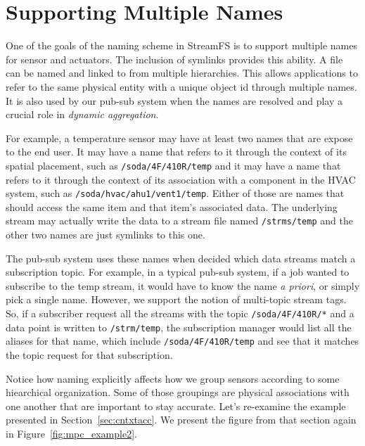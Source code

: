 \section{Supporting Multiple Names}

One of the goals of the naming scheme in StreamFS is to support multiple names for sensor and actuators.  The inclusion of symlinks 
provides this ability.  A file can be named and linked to from multiple hierarchies.  This allows applications to refer
to the same physical entity with a unique object id through multiple names.  It is also used by our pub-sub system when
the names are resolved and play a crucial role in \emph{dynamic aggregation}.

For example, a temperature sensor may have at least two names that are expose to the end user.  It may have a name that refers to 
it through the context of its spatial placement, such as \texttt{/soda/4F/410R/temp} and it may have a name that refers to it 
through the context of its association with a component in the HVAC system, such as \texttt{/soda/hvac/ahu1/vent1/temp}.  Either
of those are names that should access the same item and that item's associated data.  The underlying stream may actually write
the data to a stream file named \texttt{/strms/temp} and the other two names are just symlinks to this one.  

The pub-sub system uses these names when decided which data streams match a subscription topic.  For example, in a typical pub-sub system,
if a job wanted to subscribe to the temp stream, it would have to know the name \emph{a priori}, or simply pick a single name.
However, we support the notion of multi-topic stream tags.  So, if a subscriber request all the streams with the topic 
\texttt{/soda/4F/410R/*} and a data point is written to \texttt{/strm/temp}, the subscription manager would list all the aliases
for that name, which include \texttt{/soda/4F/410R/temp} and see that it matches the topic request for that subscription.

Notice how naming explicitly affects how we group sensors according to some hiearchical organization.  Some of those groupings
are physical associations with one another that are important to stay accurate.  Let's re-examine the example presented in
Section~\ref{sec:cntxtacc}.  We present the figure from that section again in Figure~\ref{fig:mpc_example2}.


